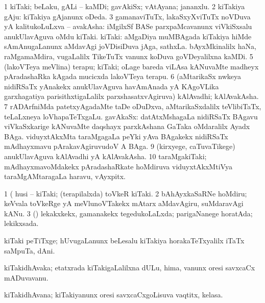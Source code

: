 \bentry
{} 
\gl{\nA}
\expl{}
\bmng
\bnum
\num{1} kiTaki; beLaku, gALi -- kaMDi; gavAkiSx; vAtAyana; jananxlu. 
\num{2} kiTakiya gAju:  kiTakiya gAjanunx oDeda. 
\num{3} gamanaviTuTx, lakaSxyXviTuTx noVDuva yA kalitukoLuLxva -- avakAsha:  iMgilxSf BASe parxpaMcavanunx viVkiSxsalu anukUlavAguva oMdu kiTaki. 
 kiTaki: 
\banum
{} aMgaDiya muMBAgada kiTakiya hiMde sAmAnugaLanunx aMdavAgi joVDisiDuva jAga, sathxLa. 
 bAyxMkinalilx haNa, raMgamaMdira, \mo vugaLalilx TikeTuTx \mo vanunx koDuva goVDeyalilxna kaMDi. 
\eanum
\numie
\num{5} (lakoVTeya meVlina) terapu; kiTaki; oLage bareda viLAsa kANuvaMte madheyx pAradashaRka kAgada mucicxda lakoVTeya terapu. 
\num{6} (aMtarikaSx nwkeya nidiRSaTx yAnakekx anukUlavAguva havAmAnada yA KAgoVLika garxhagatiya parisithxtigaLalilx parxshasatxvAgiruva) kAlAvadhi; kAlAvakAsha. 
\num{7} rADArfniMda patetxyAgadaMte taDe oDuDxva, aMtarikaSxdalilx teVlibiTaTx, teLaLxneya loVhapaTeTxgaLu. 
 gavAkaSx: 
\banum
{} datAtxMshagaLa nidiRSaTx BAgavu viVkaSxkarige kANuvaMte daqshayx parxkAshana GaTaka  oMdaralilx Ayadx BAga. 
 viduyxtAkxMta taraMgagaLa peYki yAva BAgakekx nidiRSaTx mAdhayxmavu pArakavAgiruvudoV A BAga. 
\eanum
\numie
\num{9} (kirxyege, caTuvaTikege) anukUlavAguva kAlAvadhi yA kAlAvakAsha. 
\num{10} taraMgakiTaki; mAdhayxmavoMdakekx pAradashaRkate hoMdiruva viduyxtAkxMtiVya taraMgAMtaragaLa haravu, vAyxpitx. 
\enum
\emng

\noindent
\gl{\pagu}
\expl{}
\bmng
\bnum
\num{1}  (    husi -- kiTaki; (terapilalxda) toVkeR kiTaki. 
\num{2}    bAhAyxkaSaRNe hoMdiru; keVvala toVkeRge yA meVlunoVTakekx mAtarx aMdavAgiru, suMdaravAgi kANu. 
\num{3}  (\AmA) lekakxkekx, gamanakekx tegedukoLaLxda; parigaNanege horatAda; lekikxsada. 
\enum
\emng
\eentry

\bentry
{}
\gl{\nA}
\bmng
kiTaki peTiTxge; hUvugaLanunx beLesalu kiTakiya horakaTeTxyalilx iTaTx saMpuTa, dAni. 
\emng
\eentry

\bentry
{}
\gl{\nA}
\bmng
kiTakidhAvaka; etatxrada kiTakigaLalilxna dULu, hima, \mo vanunx oresi savxcaCx mADuvavanu. 
\emng
\eentry

\bentry
{}
\gl{\nA}
\bmng
kiTakidhAvana; kiTakiyanunx oresi savxcaCxgoLisuva vaqtitx, kelasa. 
\emng
\eentry

